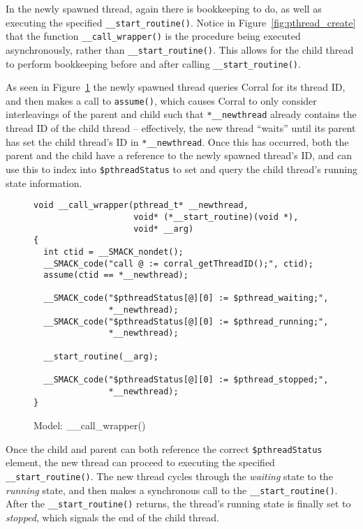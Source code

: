 In the newly spawned thread, again there is bookkeeping to do, as well
as executing the specified \lstinline|__start_routine()|.  Notice in
Figure~\ref{fig:pthread_create} that the function
\lstinline|__call_wrapper()| is the procedure being executed
asynchronously, rather than \lstinline|__start_routine()|.  This
allows for the child thread to perform bookkeeping before and after
calling \lstinline|__start_routine()|.

As seen in Figure~\ref{fig:__call_wrapper} the newly spawned thread
queries Corral for its thread ID, and then makes a call to
\lstinline|assume()|, which causes Corral to only consider
interleavings of the parent and child such that
\lstinline|*__newthread| already contains the thread ID of the child
thread -- effectively, the new thread ``waits'' until its parent has
set the child thread's ID in \lstinline|*__newthread|. Once this has
occurred, both the parent and the child have a reference to the newly
spawned thread's ID, and can use this to index into
\lstinline|$pthreadStatus| to set and query the child thread's running
state information.

\begin{figure}[h]
\centering
\caption{Model: \_\_call\_wrapper()}\label{fig:__call_wrapper}
\begin{lstlisting}
void __call_wrapper(pthread_t* __newthread,
                    void* (*__start_routine)(void *),
                    void* __arg)
{
  int ctid = __SMACK_nondet();
  __SMACK_code("call @ := corral_getThreadID();", ctid);
  assume(ctid == *__newthread);
  
  __SMACK_code("$pthreadStatus[@][0] := $pthread_waiting;",
               *__newthread);
  __SMACK_code("$pthreadStatus[@][0] := $pthread_running;",
               *__newthread);

  __start_routine(__arg);

  __SMACK_code("$pthreadStatus[@][0] := $pthread_stopped;",
               *__newthread);
}
\end{lstlisting}
\end{figure}

Once the child and parent can both reference the correct
\lstinline|$pthreadStatus| element, the new thread can proceed to
executing the specified \lstinline|__start_routine()|.  The new thread
cycles through the \emph{waiting} state to the \emph{running} state,
and then makes a synchronous call to the
\lstinline|__start_routine()|.  After the
\lstinline|__start_routine()| returns, the thread's running state is
finally set to \emph{stopped}, which signals the end of the child
thread. 

